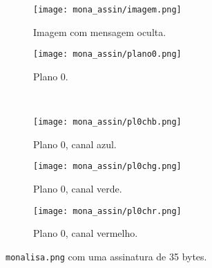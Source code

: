 \begin{figure}[H]
    \centering
    \begin{subfigure}{0.5\textwidth}
        \centering
        \texttt{[image: mona\_assin/imagem.png]}
        \caption{Imagem com mensagem oculta.}
        \label{fig:assinatura:imagem}
    \end{subfigure}%
    \begin{subfigure}{0.5\textwidth}
        \centering
        \texttt{[image: mona\_assin/plano0.png]}
        \caption{Plano 0.}
        \label{fig:assinatura:plano}
    \end{subfigure}\\[8pt]
    \begin{subfigure}{0.33\textwidth}
        \centering
        \texttt{[image: mona\_assin/pl0chb.png]}
        \caption{Plano 0, canal azul.}
        \label{fig:assinatura:blue}
    \end{subfigure}%
    \begin{subfigure}{0.33\textwidth}
        \centering
        \texttt{[image: mona\_assin/pl0chg.png]}
        \caption{Plano 0, canal verde.}
        \label{fig:assinatura:green}
    \end{subfigure}%
    \begin{subfigure}{0.33\textwidth}
        \centering
        \texttt{[image: mona\_assin/pl0chr.png]}
        \caption{Plano 0, canal vermelho.}
        \label{fig:assinatura:red}
    \end{subfigure}%

    \caption{\texttt{monalisa.png} com uma assinatura de 35 bytes.}
    \label{fig:assinatura}
\end{figure}